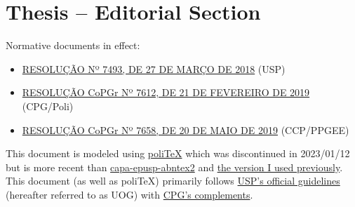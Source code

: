 \documentclass[normalnum]{politex}
\begin{document}
\setlength{\parindent}{0cm}

\section*{Thesis -- Editorial Section}

Normative documents in effect:
\begin{itemize}[nolistsep,noitemsep]
  \item \href{https://leginf.usp.br/?resolucao=resolucao-no-7493-de-27-de-marco-de-2018}{RESOLUÇÃO Nº 7493, DE 27 DE MARÇO DE 2018} (USP)
  \item \href{https://leginf.usp.br/?resolucao=resolucao-copgr-no-7612-de-21-de-fevereiro-de-2019}{RESOLUÇÃO CoPGr Nº 7612, DE 21 DE FEVEREIRO DE 2019} (CPG/Poli)
  \item \href{https://leginf.usp.br/?resolucao=resolucao-copgr-no-7658-de-20-de-maio-de-2019}{RESOLUÇÃO CoPGr Nº 7658, DE 20 DE MAIO DE 2019} (CCP/PPGEE)
\end{itemize}

This document is modeled using \href{https://github.com/lfochamon/poliTeX}{poliTeX} which was discontinued in 2023/01/12 but is more recent than \href{https://github.com/brunocfp/capa-epusp-abntex2}{capa-epusp-abntex2} and \href{http://www.ime.usp.br/~leofl/tex/modelo_poli.zip}{the version I used previously}. This document (as well as poliTeX) primarily follows \href{https://doi.org/10.11606/9786598386221}{USP's official guidelines} (hereafter referred to as UOG) with \href{https://www.poli.usp.br/bibliotecas/servicos/publicacoes-online/}{CPG's complements}.
\end{document}

